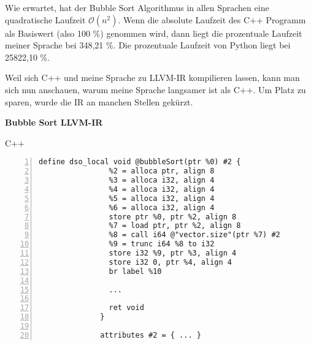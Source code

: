             \begin{adjustwidth}{2.5cm}{-1cm}  %
                
                \begin{minipage}{0.32\textwidth}
                \end{minipage}
            \end{adjustwidth}

        Wie erwartet, hat der Bubble Sort Algorithmus in allen Sprachen eine quadratische Laufzeit \(\mathcal{O}(n^2)\).
        Wenn die absolute Laufzeit des C++ Programm als Basiswert (also 100 \%) genommen wird, dann liegt die prozentuale Laufzeit
        meiner Sprache bei 348,21 \%. Die prozentuale Laufzeit von Python liegt bei 25822,10 \%. 

        Weil sich C++ und meine Sprache zu LLVM-IR kompilieren lassen, kann man sich nun anschauen, warum meine Sprache langsamer
        ist als C++.
        Um Platz zu sparen, wurde die IR an manchen Stellen gekürzt.

        \begin{center}
            \textbf{Bubble Sort LLVM-IR}
        \end{center}

        \begin{center}
            C++ 
        \end{center}

        \begin{lstlisting}[basicstyle=\tiny, numbers=left]
            define dso_local void @bubbleSort(ptr %0) #2 {
                %2 = alloca ptr, align 8
                %3 = alloca i32, align 4
                %4 = alloca i32, align 4
                %5 = alloca i32, align 4
                %6 = alloca i32, align 4
                store ptr %0, ptr %2, align 8
                %7 = load ptr, ptr %2, align 8
                %8 = call i64 @"vector.size"(ptr %7) #2
                %9 = trunc i64 %8 to i32
                store i32 %9, ptr %3, align 4
                store i32 0, ptr %4, align 4
                br label %10
              
                ...

                ret void
              }

              attributes #2 = { ... }
        \end{lstlisting}

